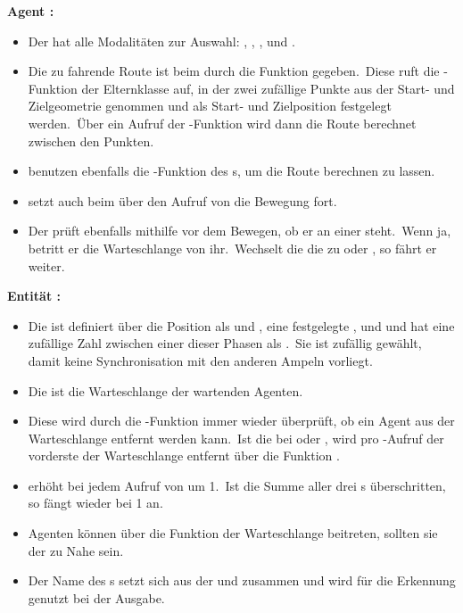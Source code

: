 \textbf{Agent :}
\begin{itemize}
    \item Der  hat alle Modalitäten zur Auswahl: , , ,  und .
    \item Die zu fahrende Route ist beim  durch die Funktion \linebreak{} gegeben.~Diese ruft die -Funktion der Elternklasse  auf, in der zwei zufällige Punkte aus der Start- und Zielgeometrie genommen und als Start- und Zielposition festgelegt werden.~Über ein Aufruf der -Funktion wird dann die Route berechnet zwischen den Punkten.
    \item {} benutzen ebenfalls die -Funktion des s, um die Route berechnen zu lassen.
    \item {} setzt auch beim  über den Aufruf von  die Bewegung fort.
    \item Der  prüft ebenfalls mithilfe  vor dem Bewegen, ob er an einer  steht.~Wenn ja, betritt er die Warteschlange von ihr.~Wechselt die  die  zu  oder , so fährt er weiter.
\end{itemize}

\textbf{Entität :}
\begin{itemize}
    \item Die  ist definiert über die Position als  und , eine festgelegte ,  und  und hat eine zufällige Zahl zwischen einer dieser Phasen als .~Sie ist zufällig gewählt, damit keine Synchronisation mit den anderen Ampeln vorliegt.
    \item Die  ist die Warteschlange der wartenden Agenten.
    \item Diese wird durch die -Funktion immer wieder überprüft, ob ein Agent aus der Warteschlange entfernt werden kann.~Ist die  bei  oder , wird pro -Aufruf der vorderste der Warteschlange entfernt über die Funktion .
    \item {} erhöht  bei jedem Aufruf von  um 1.~Ist die Summe aller drei s überschritten, so fängt  wieder bei 1 an.
    \item Agenten können über die Funktion  der Warteschlange beitreten, sollten sie der  zu Nahe sein.
    \item Der Name des s setzt sich aus der  und  zusammen und wird für die Erkennung genutzt bei der Ausgabe.
\end{itemize}


